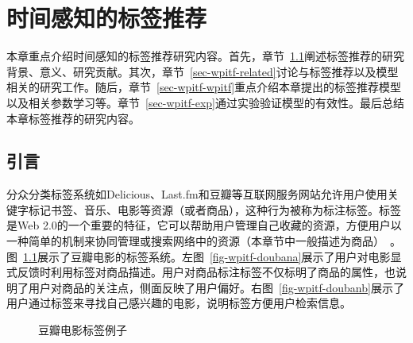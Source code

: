\chapter{时间感知的标签推荐}
\label{chapter-wpitf}
本章重点介绍时间感知的标签推荐研究内容。首先，章节~\ref{sec-wpitf-intro}阐述标签推荐的研究背景、意义、研究贡献。其次，章节~\ref{sec-wpitf-related}讨论与标签推荐以及模型相关的研究工作。随后，章节~\ref{sec-wpitf-wpitf}重点介绍本章提出的标签推荐模型以及相关参数学习等。章节~\ref{sec-wpitf-exp}通过实验验证模型的有效性。最后总结本章标签推荐的研究内容。


\section{引言}
\label{sec-wpitf-intro}
分众分类标签系统如Delicious、Last.fm和豆瓣等互联网服务网站允许用户使用关键字标记书签、音乐、电影等资源（或者商品），这种行为被称为标注标签。标签是Web 2.0的一个重要的特征，它可以帮助用户管理自己收藏的资源，方便用户以一种简单的机制来协同管理或搜索网络中的资源（本章节中一般描述为商品）~\cite{dellschaft2012measuring}。图~\ref{fig-wpitf-douban}展示了豆瓣电影的标签系统。左图~\ref{fig-wpitf-doubana}展示了用户对电影显式反馈时利用标签对商品描述。用户对商品标注标签不仅标明了商品的属性，也说明了用户对商品的关注点，侧面反映了用户偏好。右图~\ref{fig-wpitf-doubanb}展示了用户通过标签来寻找自己感兴趣的电影，说明标签方便用户检索信息。

\begin{figure}
	\centering
	\hspace{0.8cm}
	\caption{豆瓣电影标签例子}
	\label{fig-wpitf-douban}
\end{figure}

